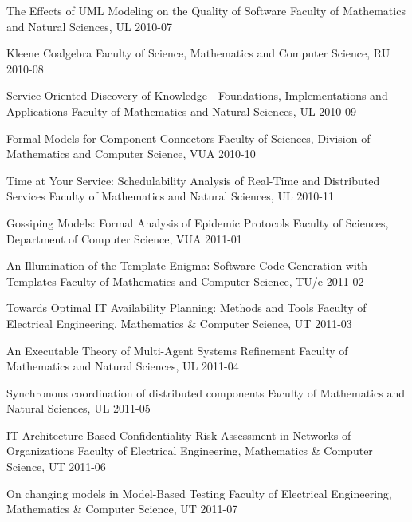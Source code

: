 \begin{multicols}{2}
         {The Effects of UML Modeling on the Quality of Software}
         {Faculty of Mathematics and Natural Sciences, UL}
         {2010-07}

         {Kleene Coalgebra}
         {Faculty of Science, Mathematics and Computer Science, RU}
         {2010-08}

         {Service-Oriented Discovery of Knowledge - Foundations, Implementations and Applications}
         {Faculty of Mathematics and Natural Sciences, UL}
         {2010-09}

         {Formal Models for Component Connectors}
         {Faculty of Sciences, Division of Mathematics and Computer Science, VUA}
         {2010-10}

         {Time at Your Service: Schedulability Analysis of Real-Time and Distributed Services}
         {Faculty of Mathematics and Natural Sciences, UL}
         {2010-11}

         {Gossiping Models: Formal Analysis of Epidemic Protocols}
         {Faculty of Sciences, Department of Computer Science, VUA}
         {2011-01}

         {An Illumination of the Template Enigma: Software Code Generation with Templates}
         {Faculty of Mathematics and Computer Science, TU/e}
         {2011-02}

         {Towards Optimal IT Availability Planning: Methods and Tools}
         {Faculty of Electrical Engineering, Mathematics \& Computer Science, UT}
         {2011-03}

         {An Executable Theory of Multi-Agent Systems Refinement}
         {Faculty of Mathematics and Natural Sciences, UL}
         {2011-04}

         {Synchronous coordination of distributed components}
         {Faculty of Mathematics and Natural Sciences, UL}
         {2011-05}

         {IT Architecture-Based Confidentiality Risk Assessment in Networks of Organizations}
         {Faculty of Electrical Engineering, Mathematics \& Computer Science, UT}
         {2011-06}

         {On changing models in Model-Based Testing}
         {Faculty of Electrical Engineering, Mathematics \& Computer Science, UT}
         {2011-07}


\end{multicols}
